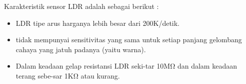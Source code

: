 Karakteristik sensor LDR adalah sebagai berikut :

\begin{itemize}
	\item LDR tipe arus harganya lebih besar dari 200K/detik.
	\item tidak mempunyai sensitivitas yang sama untuk setiap panjang gelombang cahaya yang jatuh padanya (yaitu warna).
	\item Dalam keadaan gelap resistansi LDR seki-tar 10MΩ dan dalam keadaan terang sebe-sar 1KΩ atau kurang.
\end{itemize}



